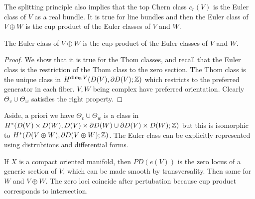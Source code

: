 \documentclass[12pt]{article}
\begin{document}
The splitting principle also implies that the top Chern class $c_r(V)$ is the Euler class of $V$ as a real bundle. It is true for line bundles and then the Euler class of $V\oplus W$ is the cup product of the Euler classes of $V$ and $W$.

\begin{proposition}
    The Euler class of $V\oplus W$ is the cup product of the Euler classes of $V$ and $W$.
\end{proposition}

\begin{proof}
    We show that it is true for the Thom classes, and recall that the Euler class is the restriction of the Thom class to the zero section. The Thom class is the unique class in $H^{\dim_{\mathbb{R}} V}(D(V), \partial D(V); \mathbb{Z})$ which restricts to the preferred generator in each fiber. $V,W$ being complex have preferred orientation. Clearly $\Theta_v \cup \Theta_w$ satisfies the right property.
\end{proof}

Aside, a priori we have $\Theta_v \cup \Theta_w$ is a class in $H^*(D(V)\times D(W), D(V)\times \partial D(W) \cup \partial D(V)\times D(W); \mathbb{Z})$ but this is isomorphic to $H^*(D(V\oplus W), \partial D(V\oplus W); \mathbb{Z})$. The Euler class can be explicitly represented using distrubtions and differential forms.

\begin{remark}
    If $X$ is a compact oriented manifold, then $PD(e(V))$ is the zero locus of a generic section of $V$, which can be made smooth by transversality. Then same for $W$ and $V\oplus W$. The zero loci coincide after pertubation because cup product corresponds to intersection.
\end{remark}
\end{document}
